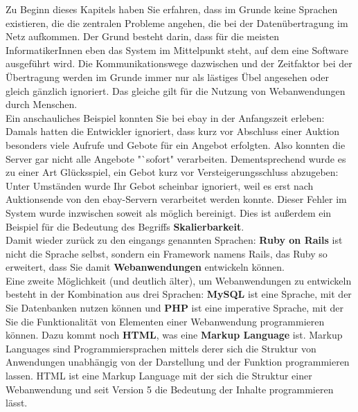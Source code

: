 Zu Beginn dieses Kapitels haben Sie erfahren, dass im Grunde keine Sprachen existieren, die die zentralen Probleme angehen, die bei der Datenübertragung im Netz aufkommen. Der Grund besteht darin, dass für die meisten InformatikerInnen eben das System im Mittelpunkt steht, auf dem eine Software ausgeführt wird. Die Kommunikationswege dazwischen und der Zeitfaktor bei der Übertragung werden im Grunde immer nur als lästiges Übel angesehen oder gleich gänzlich ignoriert. Das gleiche gilt für die Nutzung von Webanwendungen durch Menschen.\\

Ein anschauliches Beispiel konnten Sie bei ebay in der Anfangszeit erleben: Damals hatten die Entwickler ignoriert, dass kurz vor Abschluss einer Auktion besonders viele Aufrufe und Gebote für ein Angebot erfolgten. Also konnten die Server gar nicht alle Angebote "`sofort" verarbeiten. Dementsprechend wurde es zu einer Art Glücksspiel, ein Gebot kurz vor Versteigerungsschluss abzugeben: Unter Umständen wurde Ihr Gebot scheinbar ignoriert, weil es erst nach Auktionsende von den ebay-Servern verarbeitet werden konnte. Dieser Fehler im System wurde inzwischen soweit als möglich bereinigt. Dies ist außerdem ein Beispiel für die Bedeutung des Begriffs \textbf{Skalierbarkeit}.\\

Damit wieder zurück zu den eingangs genannten Sprachen: \textbf{Ruby on Rails} ist nicht die Sprache  selbst, sondern ein Framework namens Rails, das Ruby so erweitert, dass Sie damit \textbf{Webanwendungen} entwickeln können.\\

Eine zweite Möglichkeit (und deutlich älter), um Webanwendungen zu entwickeln besteht in der Kombination aus drei Sprachen: \textbf{MySQL} ist eine Sprache, mit der Sie Datenbanken nutzen können und \textbf{PHP} ist eine imperative Sprache, mit der Sie die Funktionalität von Elementen einer Webanwendung programmieren können. Dazu kommt noch \textbf{HTML}, was eine \textbf{Markup Language} ist. Markup Languages sind Programmiersprachen mittels derer sich die Struktur von Anwendungen unabhängig von der Darstellung und der Funktion programmieren lassen. HTML ist eine Markup Language mit der sich die Struktur einer Webanwendung und seit Version 5 die Bedeutung der Inhalte programmieren lässt.\\


